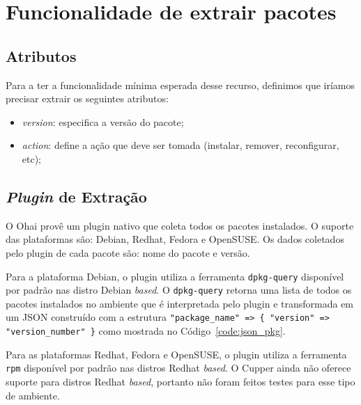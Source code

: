 \section{Funcionalidade de extrair pacotes}
\label{sec:pacotes}

\subsection{Atributos}
Para a ter a funcionalidade mínima esperada desse recurso, definimos que iríamos
precisar extrair os seguintes atributos:

\begin{itemize}
  \item \textit{version}: especifica a versão do pacote;
  \item \textit{action}: define a ação que deve ser tomada
    (instalar, remover, reconfigurar, etc);
\end{itemize}

\subsection{\textit{Plugin} de Extração}

O Ohai provê um plugin nativo que coleta todos os pacotes instalados. O suporte
das plataformas são: Debian, Redhat, Fedora e OpenSUSE. Os dados coletados pelo
plugin de cada pacote são: nome do pacote e versão.

Para a plataforma Debian, o plugin utiliza a ferramenta \texttt{dpkg-query} disponível
por padrão nas distro Debian \textit{based}. O \texttt{dpkg-query} retorna uma lista de todos os pacotes
instalados no ambiente que é interpretada pelo plugin e transformada em um JSON
construído com a estrutura \texttt{"package\_name" => \{ "version" => "version\_number" \}}
como mostrada no Código~\ref{code:json_pkg}.

\noindent\begin{minipage}{\textwidth}
  \lstset{style=shell}
  
\end{minipage}\hfill

Para as plataformas Redhat, Fedora e OpenSUSE, o plugin utiliza a ferramenta \texttt{rpm}
disponível por padrão nas distros Redhat \textit{based}. O Cupper ainda não oferece suporte
para distros Redhat \textit{based}, portanto não foram feitos testes para esse tipo de ambiente.

